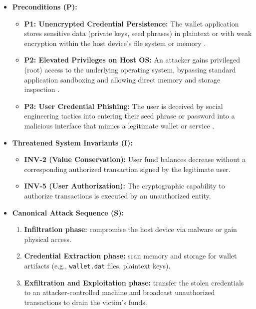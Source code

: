 \begin{itemize}
    \item \textbf{Preconditions (P):}
    \begin{itemize}
        \item \textbf{P1: Unencrypted Credential Persistence:} The wallet application stores sensitive data (private keys, seed phrases) in plaintext or with weak encryption within the host device's file system or memory \cite{houy2023}.
        \item \textbf{P2: Elevated Privileges on Host OS:} An attacker gains privileged (root) access to the underlying operating system, bypassing standard application sandboxing and allowing direct memory and storage inspection \cite{houy2023}.
        \item \textbf{P3: User Credential Phishing:} The user is deceived by social engineering tactics into entering their seed phrase or password into a malicious interface that mimics a legitimate wallet or service \cite{yu2024}.
    \end{itemize}

    \item \textbf{Threatened System Invariants (I):}
    \begin{itemize}
        \item \textbf{INV-2 (Value Conservation):} User fund balances decrease without a corresponding authorized transaction signed by the legitimate user.
        \item \textbf{INV-5 (User Authorization):} The cryptographic capability to authorize transactions is executed by an unauthorized entity.
    \end{itemize}

    \item \textbf{Canonical Attack Sequence (S):}
    \begin{enumerate}
        \item \textbf{Infiltration phase:} compromise the host device via malware or gain physical access.
        \item \textbf{Credential Extraction phase:} scan memory and storage for wallet artifacts (e.g., \texttt{wallet.dat} files, plaintext keys).
        \item \textbf{Exfiltration and Exploitation phase:} transfer the stolen credentials to an attacker-controlled machine and broadcast unauthorized transactions to drain the victim's funds.
    \end{enumerate}
\end{itemize}

